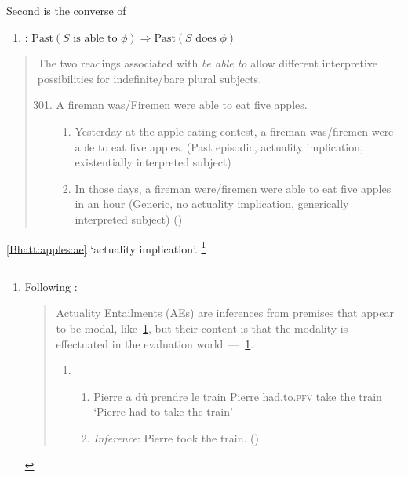 \begin{note}
  Second is the converse of \BoyPS{}

  \begin{enumerate}[label=]
  \item
    \label{Boylan:Past-Success:C}
    \BoyPSC{}: \(\text{Past}(S\text{ is able to }\phi) \Rightarrow \text{Past}(S\text{ does }\phi)\)
  \end{enumerate}

  \citeauthor{Bhatt:2008aa}

  \begin{quote}
    The two readings associated with \emph{be able to} allow different interpretive possibilities for indefinite/bare plural subjects.

    \begin{enumerate}[label=(\arabic*), ref=(\arabic*)]
      \setcounter{enumi}{300}
    \item
      A fireman was/Firemen were able to eat five apples.
      \begin{enumerate}[label=\alph*., ref=(301\alph*)]
      \item
        \label{Bhatt:apples:ae}
        Yesterday at the apple eating contest, a fireman was/firemen were able to eat five apples.
        (Past episodic, actuality implication, existentially interpreted subject)
      \item
        In those days, a fireman were/firemen were able to eat five apples in an hour (Generic, no actuality implication, generically interpreted subject)%
        \mbox{}\hfill\mbox{(\citeyear[160]{Bhatt:2008aa})}
      \end{enumerate}
    \end{enumerate}
  \end{quote}

  \ref{Bhatt:apples:ae} `actuality implication'.%
  \footnote{
    Following \textcite{Alxatib:2019wf}:
\begin{quote}
      Actuality Entailments (AEs) are inferences from premises that appear to be modal, like~\ref{Alxatib:a}, but their content is that the modality is effectuated in the evaluation world~---~\ref{Alxatib:b}.

      \begin{enumerate}[label=(\arabic*)]
      \item
        \begin{enumerate}[label=\alph*., ref=(1\alph*)]
        \item
          \label{Alxatib:a}
          Pierre a dû \phantom{to.pfv} prendre le \phantom{e} train \newline
          Pierre had.to.\textsc{pfv} take \phantom{dre} the train\newline
          `Pierre had to take the train'
        \item
          \label{Alxatib:b}
          \emph{Inference}: Pierre took the train.%
          \mbox{}\hfill\mbox{(\citeyear[701]{Alxatib:2019wf})}
        \end{enumerate}
      \end{enumerate}
    \end{quote}

}
\end{note}
